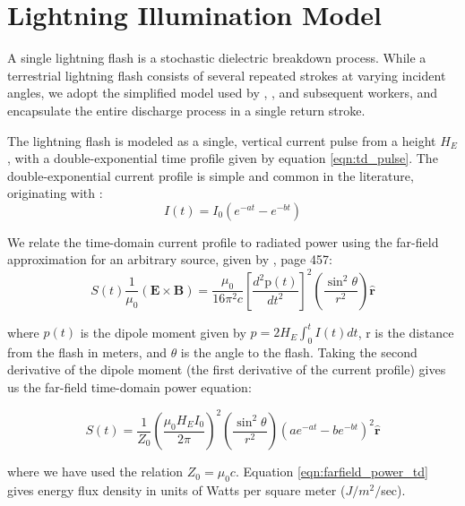 \section{Lightning Illumination Model}
\label{section:input_power}
A single lightning flash is a stochastic dielectric breakdown process. While a terrestrial lightning flash consists of several repeated strokes at varying incident angles, we adopt the simplified model used by \cite{Lauben1998}, \cite{Bortnik2005}, and subsequent workers, and encapsulate the entire discharge process in a single return stroke.

The lightning flash is modeled as a single, vertical current pulse from a height $H_E$, with a double-exponential time profile given by equation \ref{eqn:td_pulse}. The double-exponential current profile is simple and common in the literature, originating with \cite{Bruce_Golde_1941}:
\begin{equation}
\label{eqn:td_pulse}
I(t)=I_0(e^{-a t} - e^{-b t})
\end{equation}

We relate the time-domain current profile to radiated power using the far-field approximation for an arbitrary source, given by \cite{Griffiths1999}, page 457:
\begin{equation}
\label{eqn:griffiths_power}
S(t) 
 \frac{1}{\mu_0}(\mathbf{E} \times \mathbf{B}) = \frac{\mu_0}{16\pi^2c}\left[\frac{d^2\mathrm{p}(t)}{dt^2}\right]^2 \left(\frac{\sin^2\theta}{r^2}\right)\mathbf{\hat{r}}
\end{equation}

where $p(t)$ is the dipole moment given by $p=2 H_E \int_0^t{I(t)}dt$, r is the distance from the flash in meters, and $\theta$ is the angle to the flash. Taking the second derivative of the dipole moment (the first derivative of the current profile) gives us the far-field time-domain power equation:

\begin{equation}
\label{eqn:farfield_power_td}
S(t) = \frac{1}{Z_0}\left(\frac{\mu_0 H_E I_0}{2 \pi}\right)^2\left(\frac{\sin^2\theta}{r^2}\right) \left(a e^{-a t} - b e^{-b t}\right)^2  \mathbf{\hat{r}}
\end{equation}

where we have used the relation $Z_0 = \mu_0 c$. Equation \ref{eqn:farfield_power_td} gives energy flux density in units of Watts per square meter ($J/m^2/$sec).

